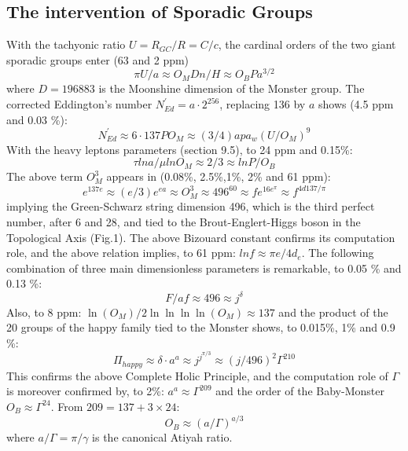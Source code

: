 \documentclass[twoside,draft]{article}
\begin{document}
\begin{sloppypar}
\subsection{The intervention of Sporadic Groups}

With the tachyonic ratio $U = R_{GC}/R = C/c$, the cardinal orders of the two giant sporadic groups enter (63 and 2 ppm)
\begin{equation}
\pi U/a \approx O_M D n/H \approx O_B P a^{3/2}
\end{equation}
where $D = 196883$ is the Moonshine dimension of the Monster group. The corrected Eddington's number $N_{Ed}^{\prime} = a \cdot 2^{256}$, replacing 136 by $a$ shows (4.5 ppm and 0.03 \%):
\begin{equation}
N_{Ed}^{\prime} \approx 6 \cdot 137PO_M \approx (3/4) a p a_w (U/O_M)^9
\end{equation}
With the heavy leptons parameters (section 9.5), to 24 ppm and 0.15\%:
\begin{equation}
\tau lna/\mu ln O_M \approx 2/3 \approx lnP/O_B
\end{equation}
The above term $O_M^3$ appears in (0.08\%, 2.5\%,1\%, 2\% and 61 ppm):
\begin{equation}
e^{137e}\approx (e/3)e^{ea}\approx O_M^3 \approx 496^{60} \approx fe^{16e^\pi} \approx f^{4d137/\pi}
\end{equation}
implying the Green-Schwarz string dimension 496, which is the third perfect number, after 6 and 28, and tied to the Brout-Englert-Higgs boson in the Topological Axis (Fig.1). The above Bizouard constant confirms its computation role, and the above relation implies, to 61 ppm: $ lnf\approx \pi e/4d_e$.
The following combination of three main dimensionless parameters is remarkable, to 0.05 \% and 0.13 \%:
\begin{equation}
F/af \approx 496\approx j^{\delta}
\end{equation}
Also, to 8 ppm: $\ln(O_{M}) /2\ln\ln\ln\ln(O_{M}) \approx 137$ and the product of the 20 groups of the happy family tied
to the Monster shows, to 0.015\%, 1\% and 0.9 \%:
\begin{equation}
\Pi_{happy} \approx \delta \cdot a^{a} \approx j^{j^{\pi/3}} \approx (j/496)^2 \Gamma^{210}
\end{equation}
This confirms the above Complete Holic Principle, and the computation role of $\Gamma$ is moreover confirmed by, to 2\%: $a^a \approx \Gamma^{209}$ and the order of the Baby-Monster $O_B\approx\Gamma^{24}$. From $209 = 137 + 3\times 24$:
\begin{equation}
O_B \approx (a/\Gamma)^{a/3}
\end{equation}
where $a/\Gamma = \pi/\gamma $ is the canonical Atiyah ratio.


\end{sloppypar}
\end{document}
